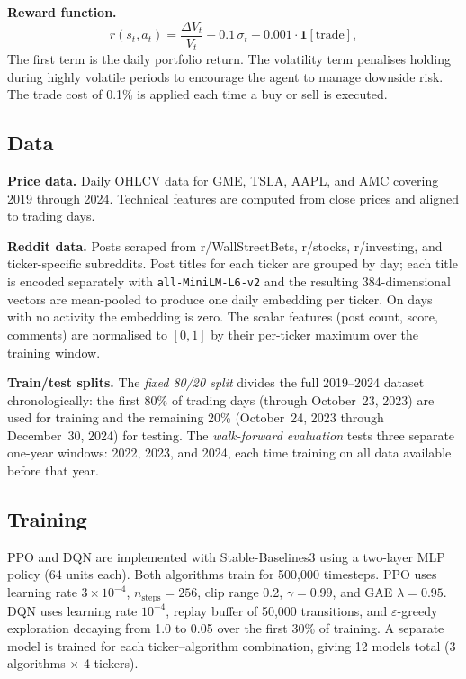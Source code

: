 \documentclass[letterpaper,twocolumn]{article}
\begin{document}
\smallskip
\noindent\textbf{Reward function.}
\begin{equation}
  r(s_t, a_t) = \frac{\Delta V_t}{V_t}
    - 0.1\,\sigma_t
    - 0.001\cdot\mathbf{1}[\text{trade}],
\end{equation}
The first term is the daily portfolio return.
The volatility term penalises holding during highly volatile
periods to encourage the agent to manage downside risk.
The trade cost of 0.1\% is applied each time a buy or sell
is executed.

\subsection{Data}

\textbf{Price data.}
Daily OHLCV data for GME, TSLA, AAPL, and AMC covering
2019 through 2024.
Technical features are computed from close prices and
aligned to trading days.

\noindent\textbf{Reddit data.}
Posts scraped from r/WallStreetBets, r/stocks, r/investing,
and ticker-specific subreddits.
Post titles for each ticker are grouped by day; each title is
encoded separately with \texttt{all-MiniLM-L6-v2} and the
resulting 384-dimensional vectors are mean-pooled to produce
one daily embedding per ticker.
On days with no activity the embedding is zero.
The scalar features (post count, score, comments) are
normalised to $[0,1]$ by their per-ticker maximum over the
training window.

\noindent\textbf{Train/test splits.}
The \emph{fixed 80/20 split} divides the full 2019--2024
dataset chronologically: the first 80\% of trading days
(through October~23, 2023) are used for training and the
remaining 20\% (October~24, 2023 through December~30, 2024)
for testing.
The \emph{walk-forward evaluation} tests three separate
one-year windows: 2022, 2023, and 2024, each time training
on all data available before that year.

\subsection{Training}

PPO and DQN are implemented with Stable-Baselines3
\citep{stable_baselines3} using a two-layer MLP policy
(64 units each).
Both algorithms train for 500,000 timesteps.
PPO uses learning rate $3\times10^{-4}$, $n_\text{steps}=256$,
clip range 0.2, $\gamma=0.99$, and GAE $\lambda=0.95$.
DQN uses learning rate $10^{-4}$, replay buffer of 50,000
transitions, and $\varepsilon$-greedy exploration decaying
from 1.0 to 0.05 over the first 30\% of training.
A separate model is trained for each ticker--algorithm
combination, giving 12 models total (3 algorithms $\times$
4 tickers).
\end{document}
